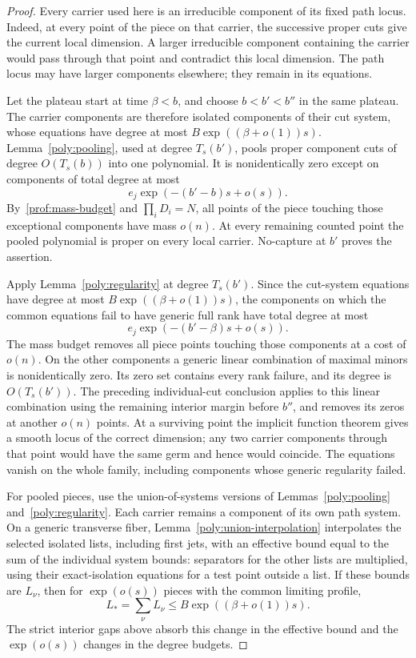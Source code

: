 \begin{proof}
Every carrier used here is an irreducible component of its fixed
path locus.  Indeed, at every point of the piece on that carrier,
the successive proper cuts give the current local dimension.  A
larger irreducible component containing the carrier would pass
through that point and contradict this local dimension.  The path
locus may have larger components elsewhere; they remain in its
equations.

Let the plateau start at time $\beta<b$, and choose
$b<b'<b''$ in the same plateau.  The carrier components are therefore
isolated components of their cut system, whose equations have degree
at most $B\exp((\beta+o(1))s)$.  Lemma~\ref{poly:pooling}, used at degree
$T_s(b')$, pools proper component cuts of degree $O(T_s(b))$ into
one polynomial.  It is nonidentically zero except on components of
total degree at most
\[
 e_j\exp(-(b'-b)s+o(s)).
\]
By~\eqref{prof:mass-budget} and $\prod_iD_i=N$, all points of the
piece touching those exceptional components have mass $o(n)$.
At every remaining counted point the pooled polynomial is proper
on every local carrier.  No-capture at $b'$ proves the assertion.

Apply Lemma~\ref{poly:regularity} at degree $T_s(b')$.  Since the
cut-system equations have degree at most $B\exp((\beta+o(1))s)$,
the components on which the common equations fail to have generic
full rank have total degree at most
\[
 e_j\exp(-(b'-\beta)s+o(s)).
\]
The mass budget removes all piece points touching those components
at a cost of $o(n)$.  On the other components a generic linear
combination of maximal minors is nonidentically zero.  Its zero set
contains every rank failure, and its degree is $O(T_s(b'))$.
The preceding individual-cut conclusion applies to this linear
combination using the remaining interior margin before $b''$, and
removes its zeros at another $o(n)$ points.  At a surviving point the
implicit function theorem gives a smooth locus of the correct dimension; any two
carrier components through that point would have the same germ
and hence would coincide.  The equations vanish on the whole
family, including components whose generic regularity failed.

For pooled pieces, use the union-of-systems versions of
Lemmas~\ref{poly:pooling} and~\ref{poly:regularity}.  Each carrier
remains a component of its own path system.  On a generic transverse
fiber, Lemma~\ref{poly:union-interpolation} interpolates the selected
isolated lists, including first jets, with an effective bound equal
to the sum of the individual system bounds: separators for the other
lists are multiplied, using their exact-isolation equations for a
test point outside a list.  If these bounds are $L_\nu$, then for
$\exp(o(s))$ pieces with the common limiting profile,
\[
 L_*=\sum_\nu L_\nu\le B\exp((\beta+o(1))s).
\]
The strict interior gaps above absorb this change in the effective
bound and the $\exp(o(s))$ changes in the degree budgets.


\end{proof}
